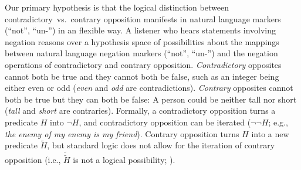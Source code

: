 \documentclass[floatsintext,doc]{apa6}
\begin{document}
Our primary hypothesis is that the logical distinction between contradictory~vs.~contrary opposition manifests in natural language markers (\enquote{not}, \enquote{un-}) in an flexible way. %
A listener who hears statements involving negation reasons over a hypothesis space of possibilities about the mappings between natural language negation markers  (\enquote{not}, \enquote{un-}) and the negation operations of contradictory and contrary opposition.
\emph{Contradictory} opposites cannot both be true and they cannot both be false, such as an integer being either even or odd (\emph{even} and \emph{odd} are contradictions).
\emph{Contrary} opposites cannot both be true but they can both be false: A person could be neither tall nor short (\emph{tall} and \emph{short} are contraries). 
Formally, a contradictory opposition turns a predicate $H$ into $\neg H$, and contradictory opposition can be iterated ($\neg \neg H$; e.g., \emph{the enemy of my enemy is my friend}).
Contrary opposition turns $H$ into a new predicate $\tilde{H}$, but standard logic does not allow for the iteration of contrary opposition (i.e., $\tilde{\tilde{H}}$ is not a logical possibility;  ).
\end{document}
